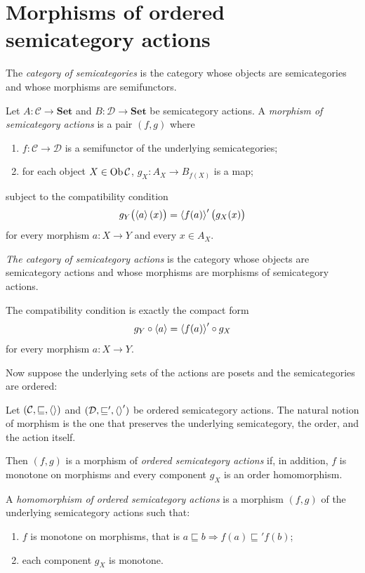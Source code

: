 \chapter{Morphisms of ordered semicategory actions}

\begin{defn}
The \emph{category of semicategories} is the category whose objects are semicategories and whose morphisms are semifunctors.
\end{defn}

\begin{defn}
Let $A:\mathcal{C}\to\mathbf{Set}$ and $B:\mathcal{D}\to\mathbf{Set}$ be semicategory actions. A \emph{morphism of semicategory actions} is a pair $(f,g)$ where
\begin{enumerate}
\item $f:\mathcal{C}\to\mathcal{D}$ is a semifunctor of the underlying semicategories;
\item for each object $X\in\operatorname{Ob}\mathcal{C}$, $g_X:A_X\to B_{f(X)}$ is a map;
\end{enumerate}
subject to the compatibility condition
\[
g_Y\bigl(\left\langle a\right\rangle(x)\bigr)=\left\langle f(a)\right\rangle'\bigl(g_X(x)\bigr)
\]
for every morphism $a:X\to Y$ and every $x\in A_X$.
\end{defn}

\begin{defn}
\emph{The category of semicategory actions} is the category whose objects are semicategory actions and whose morphisms are morphisms of semicategory actions.
\end{defn}

The compatibility condition is exactly the compact form
\[
g_Y\circ\left\langle a\right\rangle=\left\langle f(a)\right\rangle'\circ g_X
\]
for every morphism $a:X\to Y$.

Now suppose the underlying sets of the actions are posets and the semicategories are ordered:

Let $(\mathcal{C},\sqsubseteq,\left\langle \right\rangle)$ and $(\mathcal{D},\sqsubseteq',\left\langle \right\rangle')$ be ordered semicategory actions. The natural notion of morphism is the one that preserves the underlying semicategory, the order, and the action itself.

Then $(f,g)$ is a morphism of \emph{ordered semicategory actions} if, in addition, $f$ is monotone on morphisms and every component $g_X$ is an order homomorphism.

\begin{defn}
A \emph{homomorphism of ordered semicategory actions} is a morphism $(f,g)$ of the underlying semicategory actions such that:
\begin{enumerate}
\item $f$ is monotone on morphisms, that is $a\sqsubseteq b\Rightarrow f(a)\sqsubseteq'f(b)$;
\item each component $g_X$ is monotone.
\end{enumerate}
\end{defn}

